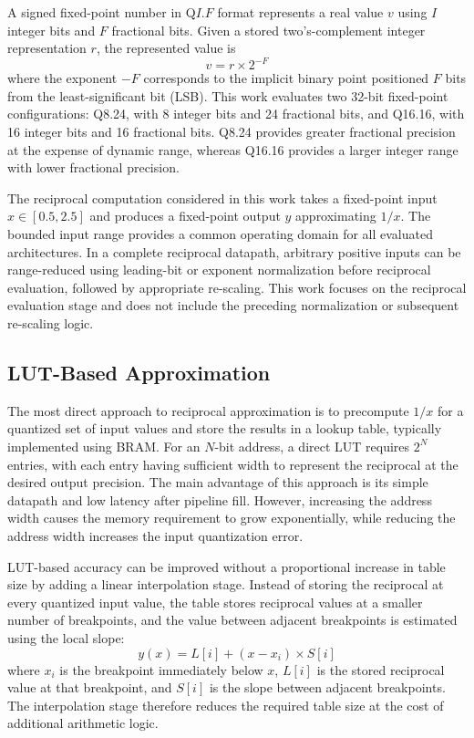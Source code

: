 \documentclass[manuscript,screen,review]{acmart}
\begin{document}
A signed fixed-point number in Q$I$.$F$ format represents a real value $v$ using $I$ integer bits and $F$ fractional bits. Given a stored two's-complement integer representation $r$, the represented value is
\begin{equation}
v = r \times 2^{-F}
\label{eq:qformat}
\end{equation}
where the exponent $-F$ corresponds to the implicit binary point positioned $F$ bits from the least-significant bit (LSB). This work evaluates two 32-bit fixed-point configurations: Q8.24, with 8 integer bits and 24 fractional bits, and Q16.16, with 16 integer bits and 16 fractional bits. Q8.24 provides greater fractional precision at the expense of dynamic range, whereas Q16.16 provides a larger integer range with lower fractional precision.

The reciprocal computation considered in this work takes a fixed-point input $x \in [0.5, 2.5]$ and produces a fixed-point output $y$ approximating $1/x$. The bounded input range provides a common operating domain for all evaluated architectures. In a complete reciprocal datapath, arbitrary positive inputs can be range-reduced using leading-bit or exponent normalization before reciprocal evaluation, followed by appropriate re-scaling. This work focuses on the reciprocal evaluation stage and does not include the preceding normalization or subsequent re-scaling logic.

\subsection{LUT-Based Approximation}

The most direct approach to reciprocal approximation is to precompute $1/x$ for a quantized set of input values and store the results in a lookup table, typically implemented using BRAM. For an $N$-bit address, a direct LUT requires $2^N$ entries, with each entry having sufficient width to represent the reciprocal at the desired output precision. The main advantage of this approach is its simple datapath and low latency after pipeline fill. However, increasing the address width causes the memory requirement to grow exponentially, while reducing the address width increases the input quantization error.

LUT-based accuracy can be improved without a proportional increase in table size by adding a linear interpolation stage. Instead of storing the reciprocal at every quantized input value, the table stores reciprocal values at a smaller number of breakpoints, and the value between adjacent breakpoints is estimated using the local slope:
\begin{equation}
y(x) = L[i] + (x - x_i) \times S[i]
\label{eq:interp}
\end{equation}
where $x_i$ is the breakpoint immediately below $x$, $L[i]$ is the stored reciprocal value at that breakpoint, and $S[i]$ is the slope between adjacent breakpoints. The interpolation stage therefore reduces the required table size at the cost of additional arithmetic logic.
\end{document}
